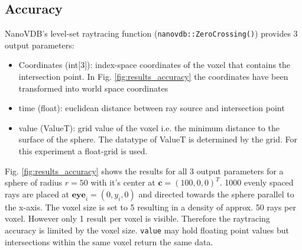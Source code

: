 \newpage
\subsection{Accuracy}

NanoVDB's level-set raytracing function (\texttt{nanovdb::ZeroCrossing()}) provides 3 output parameters:

\begin{itemize}
    \item Coordinates (int[3]): index-space coordinates of the voxel that contains the intersection point. 
    In Fig. \ref{fig:results_accuracy} the coordinates have been transformed into world space coordinates
    \item time (float): euclidean distance between ray source and intersection point
    \item value (ValueT): grid value of the voxel i.e. the minimum distance to the surface of the sphere. 
    The datatype of ValueT is determined by the grid. For this experiment a float-grid is used.
\end{itemize}

Fig. \ref{fig:results_accuracy} shows the results for all 3 output parameters for a sphere of radius $r=50$ with it's center at $\mathbf{c} = (100,0,0)^T$.
1000 evenly spaced rays are placed at $\mathbf{eye}_i = (0, y_i, 0)$ and directed towards the sphere parallel to the x-axis. 
The voxel size is set to 5 resulting in a density of approx. 50 rays per voxel.
However only 1 result per voxel is visible.
Therefore the raytracing accuracy is limited by the voxel size.
\texttt{value} may hold floating point values but intersections within the same voxel return the same data.

